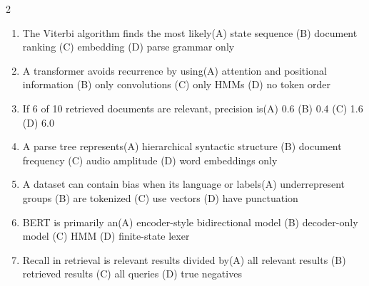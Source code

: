 \documentclass[a4paper]{article}
\begin{document}
\begin{multicols*}{2}
\begin{enumerate}
\item The Viterbi algorithm finds the most likely\newline\hspace*{0.6em}(A) state sequence \quad (B) document ranking \newline\hspace*{0.6em}(C) embedding \quad (D) parse grammar only
\item A transformer avoids recurrence by using\newline\hspace*{0.6em}(A) attention and positional information \quad (B) only convolutions \newline\hspace*{0.6em}(C) only HMMs \quad (D) no token order
\item If 6 of 10 retrieved documents are relevant, precision is\newline\hspace*{0.6em}(A) 0.6 \quad (B) 0.4 \newline\hspace*{0.6em}(C) 1.6 \quad (D) 6.0
\item A parse tree represents\newline\hspace*{0.6em}(A) hierarchical syntactic structure \quad (B) document frequency \newline\hspace*{0.6em}(C) audio amplitude \quad (D) word embeddings only
\item A dataset can contain bias when its language or labels\newline\hspace*{0.6em}(A) underrepresent groups \quad (B) are tokenized \newline\hspace*{0.6em}(C) use vectors \quad (D) have punctuation
\item BERT is primarily an\newline\hspace*{0.6em}(A) encoder-style bidirectional model \quad (B) decoder-only model \newline\hspace*{0.6em}(C) HMM \quad (D) finite-state lexer
\item Recall in retrieval is relevant results divided by\newline\hspace*{0.6em}(A) all relevant results \quad (B) retrieved results \newline\hspace*{0.6em}(C) all queries \quad (D) true negatives

\end{enumerate}
\end{multicols*}
\end{document}
